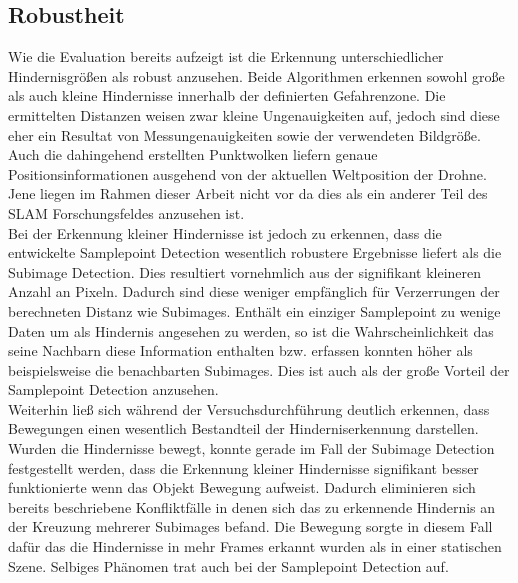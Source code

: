 
\subsection{Robustheit}
\label{subsec:discussion_robustness}
Wie die Evaluation bereits aufzeigt ist die Erkennung unterschiedlicher Hindernisgrößen als robust anzusehen. Beide Algorithmen erkennen sowohl große als auch kleine Hindernisse innerhalb der definierten Gefahrenzone. Die ermittelten Distanzen weisen zwar kleine Ungenauigkeiten auf, jedoch sind diese eher ein Resultat von Messungenauigkeiten sowie der verwendeten Bildgröße. Auch die dahingehend erstellten Punktwolken liefern genaue Positionsinformationen ausgehend von der aktuellen Weltposition der Drohne. Jene liegen im Rahmen dieser Arbeit nicht vor da dies als ein anderer Teil des SLAM Forschungsfeldes anzusehen ist.\\

\noindent
Bei der Erkennung kleiner Hindernisse ist jedoch zu erkennen, dass die entwickelte Samplepoint Detection wesentlich robustere Ergebnisse liefert als die Subimage Detection. Dies resultiert vornehmlich aus der signifikant kleineren Anzahl an Pixeln. Dadurch sind diese weniger empfänglich für Verzerrungen der berechneten Distanz wie Subimages. Enthält ein einziger Samplepoint zu wenige Daten um als Hindernis angesehen zu werden, so ist die Wahrscheinlichkeit das seine Nachbarn diese Information enthalten bzw. erfassen konnten höher als beispielsweise die benachbarten Subimages. Dies ist auch als der große Vorteil der Samplepoint Detection anzusehen.\\

\noindent
Weiterhin ließ sich während der Versuchsdurchführung deutlich erkennen, dass Bewegungen einen wesentlich Bestandteil der Hinderniserkennung darstellen. Wurden die Hindernisse bewegt, konnte gerade im Fall der Subimage Detection festgestellt werden, dass die Erkennung kleiner Hindernisse signifikant besser funktionierte wenn das Objekt Bewegung aufweist. Dadurch eliminieren sich bereits beschriebene Konfliktfälle in denen sich das zu erkennende Hindernis an der Kreuzung mehrerer Subimages befand. Die Bewegung sorgte in diesem Fall dafür das die Hindernisse in mehr Frames erkannt wurden als in einer statischen Szene. Selbiges Phänomen trat auch bei der Samplepoint Detection auf.\\

